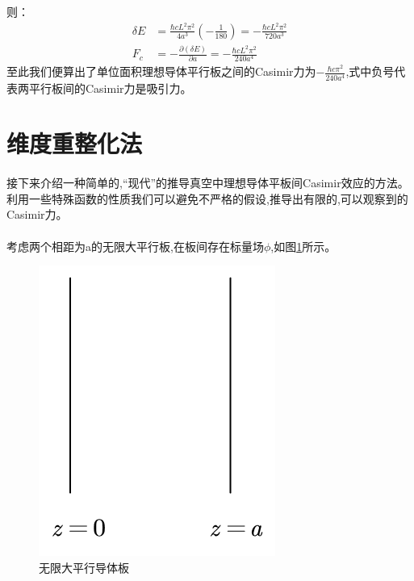 则：
\begin{equation*}
\begin{split}
\delta E &=\frac{\hbar cL^2\pi ^2}{4a^3}\left( -\frac{1}{180} \right) =-\frac{\hbar cL^2\pi ^2}{720a^3}\\ 
F_c&=-\frac{\partial \left( \delta E \right)}{\partial a}=-\frac{\hbar cL^2\pi ^2}{240a^4}
\end{split}
\end{equation*}
至此我们便算出了单位面积理想导体平行板之间的Casimir力为$-\frac{\hbar c\pi ^2}{240a^4}$,式中负号代表两平行板间的Casimir力是吸引力。



\section{维度重整化法}
\paragraph*{}
接下来介绍一种简单的,“现代”的推导真空中理想导体平板间Casimir效应的方法\cite{Milton_2001}。利用一些特殊函数的性质我们可以避免不严格的假设,推导出有限的,可以观察到的Casimir力。
\paragraph*{}
考虑两个相距为a的无限大平行板,在板间存在标量场$\phi$,如图\ref{fig:2}所示。
\begin{figure}[h]
	\centering
	\includegraphics[scale=0.6]{figures/无限大平行板}
	\caption{无限大平行导体板}
	\label{fig:2}
\end{figure}
